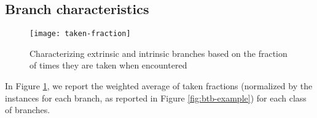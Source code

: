 \subsection{Branch characteristics}
\begin{figure}
	\centering
	\texttt{[image: taken-fraction]}
	\caption{Characterizing extrinsic and intrinsic branches based on the fraction of times they are taken when encountered
		\label{fig:taken-fraction}}
\end{figure}
In Figure \ref{fig:taken-fraction}, we report the weighted average of taken fractions (normalized by the instances for each branch, as reported in Figure \ref{fig:btb-example}) for each class of branches.

